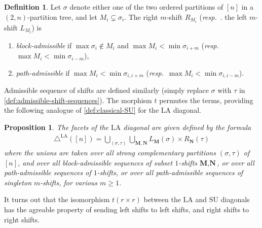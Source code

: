 \documentclass{amsart}
\newcommand{\darkblue}{\color{darkblue}} %
\newtheorem{proposition}[theorem]{Proposition}
\theoremstyle{definition}
\newtheorem{definition}[theorem]{Definition}
\newcommand{\resp}{\textit{resp.}~} %
\newcommand{\defn}[1]{\textsl{\darkblue #1}} %
\newcommand{\SU}{\mathrm{SU}}
\newcommand{\LA}{\mathrm{LA}}
\newcommand{\LAD}{\triangle^{\mathrm{LA}}}
\begin{document}
\begin{definition}
\label{def:LA-admissible}
Let $\sigma$ denote either one of the two ordered partitions of $[n]$ in a $(2,n)$-partition tree, and let $M_i \subsetneq \sigma_i$.
The right $m$-shift $R_{M_i}$ (\resp. the left $m$-shift $L_{M_{i}}$) is 
\begin{enumerate}
	\item \defn{block-admissible} if $\max \sigma_i \notin M_i$ and $\max M_i < \min \sigma_{i+m}$ (\resp $\max M_{i} < \min \sigma_{i-m}$),
	\item \defn{path-admissible} if $\max M_i< \min \sigma_{i,i+m}$ (\resp $\max M_{i} < \min \sigma_{i,i-m}$).
\end{enumerate}
\end{definition}

Admissible sequence of shifts are defined similarly (simply replace $\sigma$ with $\tau$ in \cref{def:admissible-shift-sequences}).
The morphism $t$ permutes the terms, providing the following analogue of \cref{def:classical-SU} for the $\LA$ diagonal. 

\begin{proposition}
\label{def:classical-LA}
The facets of the $\LA$ diagonal are given defined by the formula
\begin{align*}
\LAD([n]) = \bigcup_{(\sigma,\tau)} \bigcup_{\mathbf{M}, \mathbf{N}} L_\mathbf{M}(\sigma)\times R_\mathbf{N}(\tau)
\end{align*}
where the unions are taken over all strong complementary partitions $(\sigma, \tau)$ of $[n]$, and over all block-admissible sequences of subset $1$-shifts $\textbf{M},\textbf{N}$, or over all path-admissible sequences of $1$-shifts, or over all path-admissible sequences of singleton $m$-shifts, for various $m\geq 1$.
\end{proposition}

It turns out that the isomorphism $t(r \times r)$ between the $\LA$ and $\SU$ diagonals has the agreable property of sending left shifts to left shifts, and right shifts to right shifts. 
\end{document}
